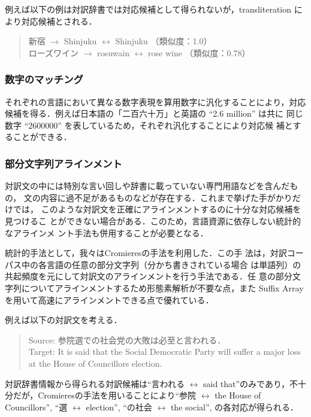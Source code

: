 \documentclass[japanese]{jnlp_1.4}
\begin{document}
例えば以下の例は対訳辞書では対応候補として得られないが，transliteration
により対応候補とされる．


\begin{quote}
新宿 $\rightarrow$ Shinjuku $\leftrightarrow$ Shinjuku （類似度：1.0） \\
ローズワイン $\rightarrow$ rosuwain $\leftrightarrow$ rose wine
（類似度：0.78）
\end{quote}

\subsubsection{数字のマッチング}

それぞれの言語において異なる数字表現を算用数字に汎化することにより，対応
候補を得る．例えば日本語の「二百六十万」と英語の ``2.6 million'' は共に
同じ数字 ``2600000'' を表しているため，それぞれ汎化することにより対応候
補とすることができる．


\subsubsection{部分文字列アラインメント}
\label{Fabien}

対訳文の中には特別な言い回しや辞書に載っていない専門用語などを含んだもの，
文の内容に過不足があるものなどが存在する．これまで挙げた手がかりだけでは，
このような対訳文を正確にアラインメントするのに十分な対応候補を見つけるこ
とができない場合がある．このため，言語資源に依存しない統計的なアラインメ
ント手法も併用することが必要となる．


統計的手法として，我々はCromieresの手法\cite{Fabien06}を利用した．この手
法は，対訳コーパス中の各言語の任意の部分文字列（分かち書きされている場合
は単語列）の共起頻度を元にして対訳文のアラインメントを行う手法である．任
意の部分文字列についてアラインメントするため形態素解析が不要な点，また
Suffix Arrayを用いて高速にアラインメントできる点で優れている．


例えば以下の対訳文を考える．
\begin{quote}
Source: 参院選での社会党の大敗は必至と言われる．\\
Target: It is said that the Social Democratic Party will suffer a major
loss at the House of Councillors election.
\end{quote}

対訳辞書情報から得られる対訳候補は``言われる $\leftrightarrow$ said
that''のみであり，不十分だが，Cromieresの手法を用いることにより``参院 
$\leftrightarrow$ the House of Councillors'', ``選 $\leftrightarrow$
election'', ``の社会 $\leftrightarrow$ the social'', の各対応が得られる．
\end{document}
